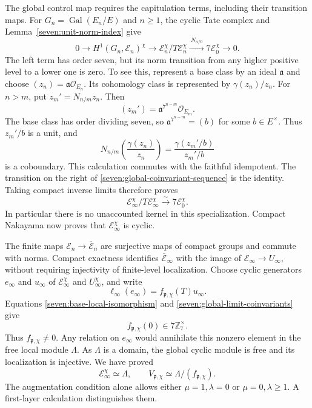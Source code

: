 The global control map requires the capitulation terms, including
their transition maps.
For $G_n=\operatorname{Gal}(E_n/E)$ and $n\ge1$, the cyclic Tate
complex and Lemma~\ref{seven:unit-norm-index} give
\begin{equation*}\tag{U7}\label{seven:global-coinvariant-sequence}
 0\longrightarrow H^1(G_n,\mathcal E_n)^\chi
 \longrightarrow\mathcal E_n^\chi/T\mathcal E_n^\chi
 \xrightarrow{\ N_{n/0}\ }7\mathcal E_0^\chi
 \longrightarrow0.
\end{equation*}
The left term has order seven, but its norm transition from any higher
positive level to a lower one is zero. To see this, represent a base
class by an ideal $\mathfrak a$ and choose
$(z_n)=\mathfrak a\mathcal O_{E_n}$. Its cohomology class is represented
by $\gamma(z_n)/z_n$. For $n>m$, put $z_m'=N_{n/m}z_n$.
Then
\[
 (z_m')=\mathfrak a^{7^{n-m}}\mathcal O_{E_m}.
\]
The base class has order dividing seven, so
$\mathfrak a^{7^{n-m}}=(b)$ for some $b\in E^\times$.
Thus $z_m'/b$ is a unit, and
\[
 N_{n/m}\!\left(\frac{\gamma(z_n)}{z_n}\right)
 =\frac{\gamma(z_m'/b)}{z_m'/b}
\]
is a coboundary. This calculation commutes with the faithful
idempotent. The transition on the right of
\eqref{seven:global-coinvariant-sequence} is the identity.
Taking compact inverse limits therefore proves
\begin{equation*}\tag{U8}\label{seven:global-limit-coinvariants}
 \mathcal E_\infty^\chi/T\mathcal E_\infty^\chi
 \xrightarrow{\ \sim\ }7\mathcal E_0^\chi.
\end{equation*}
In particular there is no unaccounted kernel in this specialization.
Compact Nakayama now proves that $\mathcal E_\infty^\chi$ is cyclic.

The finite maps $\mathcal E_n\to\overline{\mathcal E}_n$ are surjective
maps of compact groups and commute with norms. Compact exactness
identifies $\overline{\mathcal E}_\infty$ with the image of
$\mathcal E_\infty\to U_\infty$, without requiring injectivity of
finite-level localization. Choose cyclic generators $e_\infty$ and
$u_\infty$ of $\mathcal E_\infty^\chi$ and $U_\infty^\chi$, and write
\[
 \ell_\infty(e_\infty)=f_{\mathfrak p,\chi}(T)u_\infty.
\]
Equations \eqref{seven:base-local-isomorphism} and
\eqref{seven:global-limit-coinvariants} give
\begin{equation*}\tag{U9}\label{seven:unit-factor-augmentation}
 f_{\mathfrak p,\chi}(0)\in7\mathbb Z_7^\times.
\end{equation*}
Thus $f_{\mathfrak p,\chi}\ne0$. Any relation on $e_\infty$ would
annihilate this nonzero element in the free local module $\Lambda$.
As $\Lambda$ is a domain, the global cyclic module is free and its
localization is injective. We have proved
\begin{equation*}\tag{U10}\label{seven:unit-factor}
 \mathcal E_\infty^\chi\simeq\Lambda,\qquad
 V_{\mathfrak p,\chi}\simeq\Lambda/(f_{\mathfrak p,\chi}).
\end{equation*}
The augmentation condition alone allows either $\mu=1,\lambda=0$
or $\mu=0,\lambda\ge1$. A first-layer calculation distinguishes them.

